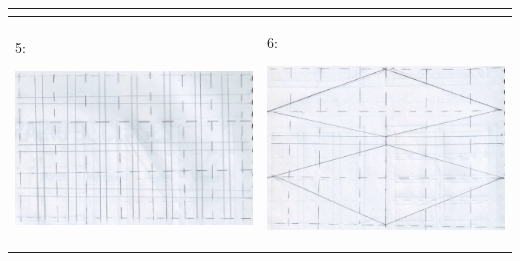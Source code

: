 \begin{table}[H]
\begin{tabular}{@{}|p{7cm}|p{7cm}|}
\begin{center}
		\end{center}
		\\ \hline
		5:
		\begin{center}
			\includegraphics[width=6.5cm]{imagenes/alma5}
		\end{center}
		&
		6:
		\begin{center}
			\includegraphics[width=6.5cm]{imagenes/alma6}
		\end{center}
		\\ \hline
	\end{tabular}	
	
	\label{tabla:almas}
\end{table}


